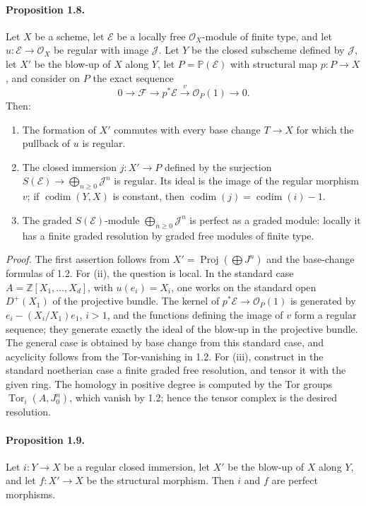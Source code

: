 \documentclass[12pt]{article}
\newcommand{\ZZ}{\mathbb Z}
\newcommand{\cO}{\mathcal O}
\newcommand{\cJ}{\mathcal J}
\newcommand{\uE}{\mathcal E}
\newcommand{\uF}{\mathcal F}
\newcommand{\Tor}{\operatorname{Tor}}
\newcommand{\Proj}{\operatorname{Proj}}
\newcommand{\codim}{\operatorname{codim}}
\newcommand{\xto}[1]{\xrightarrow{#1}}
\newcommand{\bbP}{\mathbb P}
\begin{document}
\paragraph{Proposition 1.8.} Let $X$ be a scheme, let $\uE$ be a locally free $\cO_X$-module of finite type, and let $u:\uE\to\cO_X$ be regular with image $\cJ$. Let $Y$ be the closed subscheme defined by $\cJ$, let $X'$ be the blow-up of $X$ along $Y$, let $P=\bbP(\uE)$ with structural map $p:P\to X$, and consider on $P$ the exact sequence
\[
0\to\uF\to p^*\uE\xto{v}\cO_P(1)\to0.
\]
Then:
\begin{enumerate}[label=\roman*)]
\item The formation of $X'$ commutes with every base change $T\to X$ for which the pullback of $u$ is regular.
\item The closed immersion $j:X'\to P$ defined by the surjection $S(\uE)\to\bigoplus_{n\geq0}\cJ^n$ is regular. Its ideal is the image of the regular morphism $v$; if $\codim(Y,X)$ is constant, then $\codim(j)=\codim(i)-1$.
\item The graded $S(\uE)$-module $\bigoplus_{n\geq0}\cJ^n$ is perfect as a graded module: locally it has a finite graded resolution by graded free modules of finite type.
\end{enumerate}

\emph{Proof.} The first assertion follows from $X'=\Proj(\bigoplus J^n)$ and the base-change formulas of 1.2. For (ii), the question is local. In the standard case $A=\ZZ[X_1,\ldots,X_d]$, with $u(e_i)=X_i$, one works on the standard open $D^+(X_1)$ of the projective bundle. The kernel of $p^*\uE\to\cO_P(1)$ is generated by $e_i-(X_i/X_1)e_1$, $i>1$, and the functions defining the image of $v$ form a regular sequence; they generate exactly the ideal of the blow-up in the projective bundle. The general case is obtained by base change from this standard case, and acyclicity follows from the Tor-vanishing in 1.2. For (iii), construct in the standard noetherian case a finite graded free resolution, and tensor it with the given ring. The homology in positive degree is computed by the Tor groups $\Tor_i(A,J_0^n)$, which vanish by 1.2; hence the tensor complex is the desired resolution.

\paragraph{Proposition 1.9.} Let $i:Y\to X$ be a regular closed immersion, let $X'$ be the blow-up of $X$ along $Y$, and let $f:X'\to X$ be the structural morphism. Then $i$ and $f$ are perfect morphisms.
\end{document}

